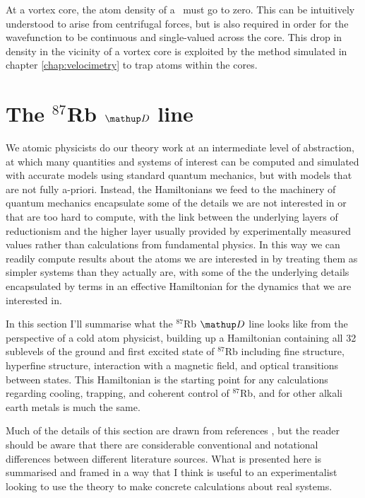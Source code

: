 At a vortex core, the atom density of a \bec\ must go to zero. This can be intuitively understood to arise from centrifugal forces, but is also required in order for the wavefunction to be continuous and single-valued across the core. This drop in density in the vicinity of a vortex core is exploited by the method simulated in chapter \ref{chap:velocimetry} to trap atoms within the cores.

\section{The $^{87}$Rb $\up{D}$ line}\label{sec:the_rubidium_D_line}

We atomic physicists do our theory work at an intermediate level of abstraction, at which many quantities and systems of interest can be computed and simulated with accurate models using standard quantum mechanics, but with models that are not fully a-priori. Instead, the Hamiltonians we feed to the machinery of quantum mechanics encapsulate some of the details we are not interested in or that are too hard to compute, with the link between the underlying layers of reductionism and the higher layer usually provided by experimentally measured values rather than calculations from fundamental physics. In this way we can readily compute results about the atoms we are interested in by treating them as simpler systems than they actually are, with some of the the underlying details encapsulated by terms in an effective Hamiltonian for the dynamics that we are interested in.

In this section I'll summarise what the $^{87}$Rb $\up{D}$ line looks like from the perspective of a cold atom physicist, building up a Hamiltonian containing all 32 sublevels of the ground and first excited state of $^{87}$Rb including fine structure, hyperfine structure, interaction with a magnetic field, and optical transitions between states. This Hamiltonian is the starting point for any calculations regarding cooling, trapping, and coherent control of $^{87}$Rb, and for other alkali earth metals is much the same.

Much of the details of this section are drawn from references \cite{steck_rubidium_2015, steck_quantum_2017, metcalf_laser_1999, king_angular_2008, farrell_consistency_1995}, but the reader should be aware that there are considerable conventional and notational differences between different literature sources. What is presented here is summarised and framed in a way that I think is useful to an experimentalist looking to use the theory to make concrete calculations about real systems.

